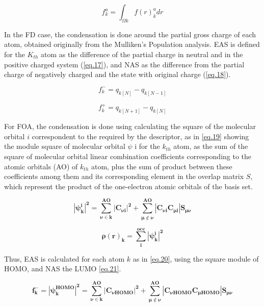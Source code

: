 \documentclass[a4paper,11pt]{refart}
\begin{document}
\begin{equation}
f_k^{a} = \int_{\Omega k} f(r)^{a}_{k}dr
\label{eq.16}
\end{equation}

In the FD case, the condensation is done around the partial gross charge of each atom, obtained originally from the Mulliken's Population analysis. EAS is defined for the $K_{th}$ atom as the difference of the partial charge in neutral and in the positive charged system (\autoref{eq.17}), and NAS as the difference from the partial charge of negatively charged and the state with original charge (\autoref{eq.18}).

\begin{equation}
f^{-}_k = q_{k [N]} - q_{k [N-1]}
\label{eq.17}
\end{equation}

\begin{equation}
f^{+}_k = q_{k [N+1]} - q_{k [N]}
\label{eq.18}
\end{equation}

For FOA, the condensation is done using calculating the square of the molecular orbital $i$ correspondent to the required by the descriptor, as in \autoref{eq.19} showing the module square of  molecular orbital $\psi$ i for the $k_{th}$ atom, as the sum of the square of molecular orbital linear combination coefficients corresponding to the atomic orbitals (AO) of $k_{th}$ atom, plus the sum of product between these coefficients among them and its corresponding element in the overlap matrix $S$, which represent the product of the one-electron atomic orbitals of the basis set.
 
\begin{equation}
\mathbf{|\psi^i_k|^2  =\sum_{\nu \in k}^{AO} |C_{\nu i}|^{2} + \sum_{\mu \notin \nu }^{AO} |C_{\nu i} C_{\mu i}|S_{\mu \nu} }
\label{eq.19}
\end{equation}

\begin{equation}
\mathbf{ \rho(r)_k = \sum_{i}^{occ}|\psi^i_k|^2   }
\label{eq.1o9}
\end{equation}


Thus, EAS is calculated for each atom $k$ as in \autoref{eq.20}, using the square module of HOMO, and NAS the LUMO \autoref{eq.21}. 

\begin{equation}
\mathbf{f^-_k =|\psi^{HOMO}_k|^2 =  \sum_{\nu \in k}^{AO} |C_{\nu HOMO}|^{2} + \sum_{\mu \notin \nu }^{AO} |C_{\nu HOMO} C_{\mu HOMO}|S_{\mu \nu}}
\label{eq.20}
\end{equation}
\end{document}
